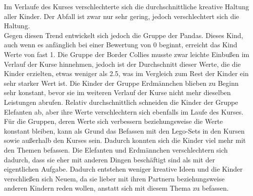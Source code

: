 Im Verlaufe des Kurses verschlechterte sich die durchschnittliche kreative Haltung aller Kinder. Der Abfall ist zwar nur sehr gering, jedoch verschlechtert sich die Haltung.\\
Gegen diesen Trend entwickelt sich jedoch die Gruppe der Pandas. Dieses Kind, auch wenn es anfänglich bei einer Bewertung von 0 beginnt, erreicht das Kind Werte von fast 1.
Die Gruppe der Border Collies musste zwar leichte Einbußen im Verlauf der Kurse hinnehmen, jedoch ist der Durchschnitt dieser Werte, die die Kinder erzielten, etwas weniger als 2.5, was im Vergleich zum Rest der Kinder ein sehr starker Wert ist. Die Kinder der Gruppe Erdmännchen blieben zu Beginn sehr konstant, bevor sie im weiteren Verlauf der Kurse nicht mehr dieselben Leistungen abrufen. Relativ durchschnittlich schneiden die Kinder der Gruppe Elefanten ab, aber ihre Werte verschlechtern sich ebenfalls im Laufe des Kurses.\\
Für die Gruppen, deren Werte sich verbessern beziehungsweise die Werte konstant bleiben, kann als Grund das Befassen mit den \gls{Lego}-Sets in den Kursen sowie außerhalb den Kurses sein. Dadurch konnten sich die Kinder viel mehr mit den Themen befassen. Die Elefanten und Erdmännchen verschlechtern sich dadurch, dass sie eher mit anderen Dingen beschäftigt sind als mit der eigentlichen Aufgabe. Dadurch entstehen weniger kreative Ideen und die Kinder verschließen sich Neuem, da sie lieber mit ihren Partnern beziehungsweise anderen Kindern reden wollen, anstatt sich mit diesem Thema zu befassen.

